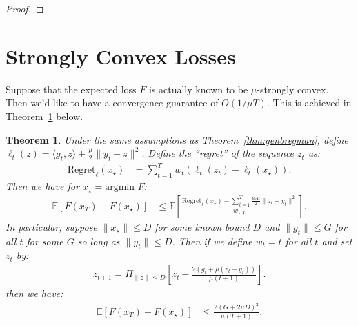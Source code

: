 \documentclass{article}
\newtheorem{theorem}{Theorem}
\newcommand{\E}{\mathbb{E}}
\begin{document}
\begin{proof}
\end{proof} \section{Strongly Convex Losses}\label{sec:strongconvex}

Suppose that the expected loss $F$ is actually known to be $\mu$-strongly convex. Then we'd like  to have a convergence guarantee of $O(1/\mu T)$. This is achieved in Theorem~\ref{thm:strongconvex} below.

\begin{theorem}\label{thm:strongconvex}
Under the same assumptions as Theorem~\ref{thm:genbregman}, define $\ell_t(z) = \langle g_t, z\rangle + \frac{\mu}{2}\|y_t - z\|^2$. Define the ``regret'' of the sequence $z_t$ as:
\begin{align*}
    \text{Regret}_{\ell} (x_\star) &= \sum_{t=1}^T w_t(\ell_t(z_t) - \ell_t(x_\star)).
\end{align*}
Then  we have for $x_\star=\text{argmin } F$:
\begin{align*}
    \E[F(x_T) - F(x_\star)]&\le \E\left[\frac{\text{Regret}_{\ell}(x_\star)-\sum_{t=1}^T \frac{w_t \mu}{2}\|z_t -y_t\|^2}{w_{1:T}}\right].
\end{align*}
In particular, suppose $\|x_\star\|\le D$ for some known bound $D$ and $\|g_t\|\le G$ for all $t$ for some $G$ so long as  $\|y_t\|\le D$. Then if we  define  $w_t=t$ for all $t$ and set $z_t$ by:
\begin{align*}
    z_{t+1} = \Pi_{\|z\|\le D} \left[z_t - \frac{2(g_t + \mu (z_t - y_t))}{\mu  (t+1)} \right].
\end{align*}
then we have:
\begin{align*}
    \E[F(x_T) - F(x_\star)]&\le \frac{2(G+2\mu D)^2}{\mu (T+1)}.
\end{align*}
\end{theorem}
\end{document}
